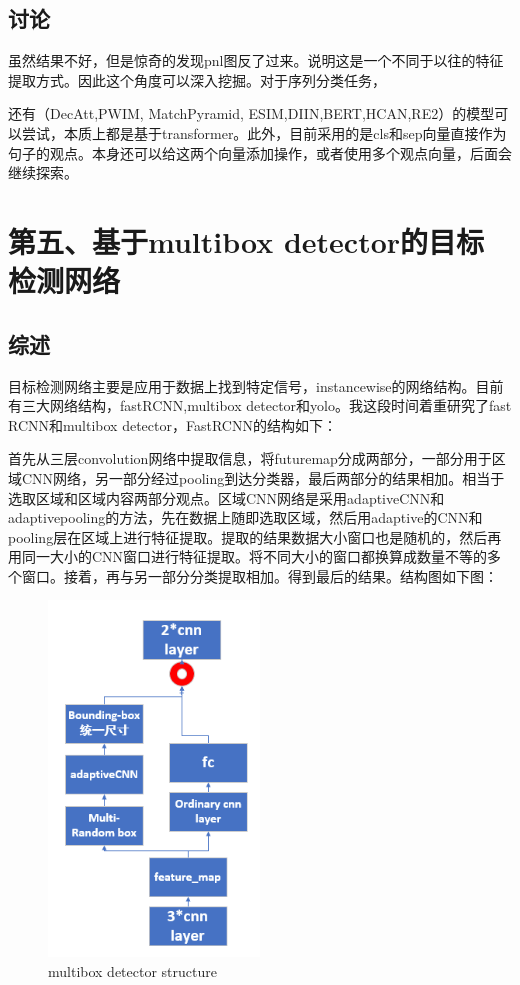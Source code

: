 \documentclass[11pt]{ctexart}
\begin{document}
\subsection{讨论}
虽然结果不好，但是惊奇的发现pnl图反了过来。说明这是一个不同于以往的特征提取方式。因此这个角度可以深入挖掘。对于序列分类任务，\par 还有（DecAtt,PWIM,  MatchPyramid, ESIM,DIIN,BERT,HCAN,RE2）的模型可以尝试，本质上都是基于transformer。此外，目前采用的是cls和sep向量直接作为句子的观点。本身还可以给这两个向量添加操作，或者使用多个观点向量，后面会继续探索。


\section{第五、基于multibox detector的目标检测网络}
\subsection{综述}
目标检测网络主要是应用于数据上找到特定信号，instancewise的网络结构。目前有三大网络结构，fastRCNN,multibox detector和yolo。我这段时间着重研究了fast RCNN和multibox detector，FastRCNN的结构如下：

首先从三层convolution网络中提取信息，将futuremap分成两部分，一部分用于区域CNN网络，另一部分经过pooling到达分类器，最后两部分的结果相加。相当于选取区域和区域内容两部分观点。区域CNN网络是采用adaptiveCNN和adaptivepooling的方法，先在数据上随即选取区域，然后用adaptive的CNN和pooling层在区域上进行特征提取。提取的结果数据大小窗口也是随机的，然后再用同一大小的CNN窗口进行特征提取。将不同大小的窗口都换算成数量不等的多个窗口。接着，再与另一部分分类提取相加。得到最后的结果。结构图如下图：
\begin{figure}[H]
\begin{center}
\includegraphics[width=0.5\textwidth]{str2.PNG}
\end{center}
\caption{multibox detector structure}
\label{FIG.11}
\end{figure}
\end{document}
